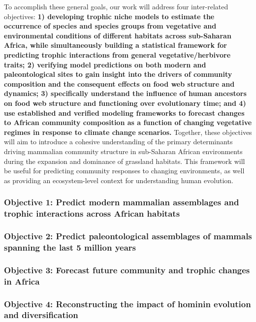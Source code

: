 \documentclass[11pt]{article}
\begin{document}
To accomplish these general goals, our work will address four inter-related objectives: 
{\bf 1) developing trophic niche models to estimate the occurrence of species and species groups from vegetative and environmental conditions of different habitats across sub-Saharan Africa, while simultaneously building a statistical framework for predicting trophic interactions from general vegetative/herbivore traits; 
2) verifying model predictions on both modern and paleontological sites to gain insight into the drivers of community composition and the consequent effects on food web structure and dynamics;
3) specifically understand the influence of human ancestors on food web structure and functioning over evolutionary time; and
4) use established and verified modeling frameworks to forecast changes to African community composition as a function of changing vegetative regimes in response to climate change scenarios.
}
Together, these objectives will aim to introduce a cohesive understanding of the primary determinants driving mammalian community structure in sub-Saharan African environments during the expansion and dominance of grassland habitats.
This framework will be useful for predicting community responses to changing environments, as well as providing an ecosystem-level context for understanding human evolution.



\subsubsection*{\sf Objective 1: Predict modern mammalian assemblages and trophic interactions across African habitats}

\subsubsection*{\sf Objective 2: Predict paleontological assemblages of mammals spanning the last 5 million years}



\subsubsection*{\sf Objective 3: Forecast future community and trophic changes in Africa}




\subsubsection*{\sf Objective 4: Reconstructing the impact of hominin evolution and diversification}
\end{document}

